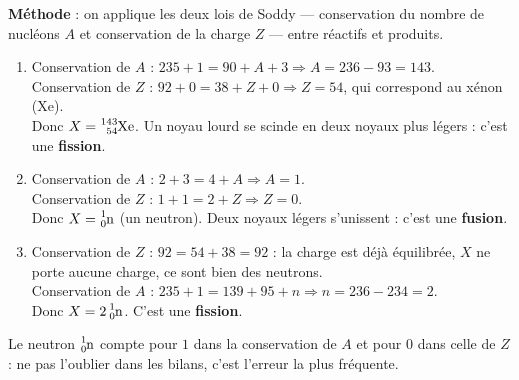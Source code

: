 \documentclass[11pt]{article}
\newcounter{popsec}
\newcounter{popsub}
\newcommand{\courssub}[1]{%
  \stepcounter{popsub}%
  \par\vspace{9pt}\noindent{\popxbold\fontsize{11.5}{13}\selectfont\color{popink}{\color{poporange}\thepopsec.\thepopsub}\hspace{6pt}#1}\par\nopagebreak\vspace{4pt}
}
\begin{document}
\courssub{Je m'entraîne}

\begin{corrige}
\textbf{Méthode} : on applique les deux lois de Soddy — conservation du nombre de nucléons $A$ et conservation de la charge $Z$ — entre réactifs et produits.
\begin{enumerate}
\item Conservation de $A$ : $235 + 1 = 90 + A + 3 \Rightarrow A = 236 - 93 = 143$.\\
Conservation de $Z$ : $92 + 0 = 38 + Z + 0 \Rightarrow Z = 54$, qui correspond au xénon (Xe).\\
Donc $X = \ce{^{143}_{54}Xe}$. Un noyau lourd se scinde en deux noyaux plus légers : c'est une \textbf{fission}.
\item Conservation de $A$ : $2 + 3 = 4 + A \Rightarrow A = 1$.\\
Conservation de $Z$ : $1 + 1 = 2 + Z \Rightarrow Z = 0$.\\
Donc $X = \ce{^{1}_{0}n}$ (un neutron). Deux noyaux légers s'unissent : c'est une \textbf{fusion}.
\item Conservation de $Z$ : $92 = 54 + 38 = 92$ : la charge est déjà équilibrée, $X$ ne porte aucune charge, ce sont bien des neutrons.\\
Conservation de $A$ : $235 + 1 = 139 + 95 + n \Rightarrow n = 236 - 234 = 2$.\\
Donc $X = 2\,\ce{^{1}_{0}n}$. C'est une \textbf{fission}.
\end{enumerate}
\begin{attention}
Le neutron $\ce{^{1}_{0}n}$ compte pour $1$ dans la conservation de $A$ et pour $0$ dans celle de $Z$ : ne pas l'oublier dans les bilans, c'est l'erreur la plus fréquente.
\end{attention}
\end{corrige}
\end{document}
